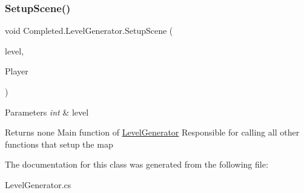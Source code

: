 \subsubsection{\texorpdfstring{Setup\+Scene()}{SetupScene()}}
{\footnotesize\ttfamily void Completed.\+Level\+Generator.\+Setup\+Scene (\begin{DoxyParamCaption}\item[{int}]{level,  }\item[{Game\+Object}]{Player }\end{DoxyParamCaption})\hspace{0.3cm}{\ttfamily [inline]}}


\begin{DoxyParams}{Parameters}
{\em int} & level \\
\hline
\end{DoxyParams}
\begin{DoxyReturn}{Returns}
none Main function of \mbox{\hyperlink{class_completed_1_1_level_generator}{Level\+Generator}} Responsible for calling all other functions that setup the map 
\end{DoxyReturn}


The documentation for this class was generated from the following file\+:\begin{DoxyCompactItemize}
\item 
Level\+Generator.\+cs\end{DoxyCompactItemize}
